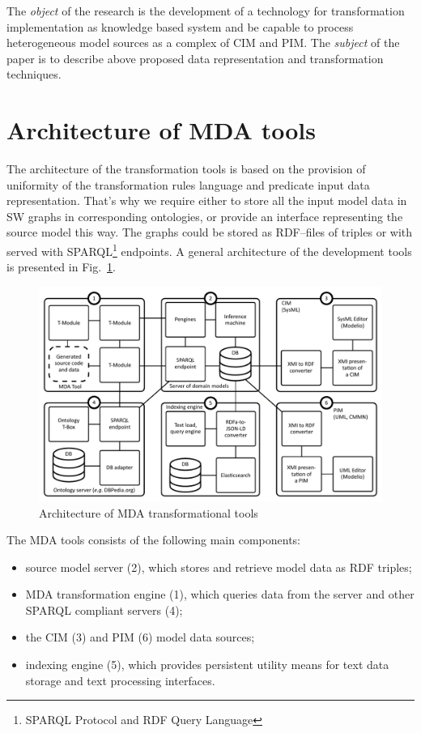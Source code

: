 \documentclass[conference]{IEEEtran}
\begin{document}
The \emph{object} of the research is the development of a technology for transformation implementation as knowledge based system and be capable to process heterogeneous model sources as a complex of CIM and PIM. The \emph{subject} of the paper is to describe above proposed data representation and transformation techniques.

\section{Architecture of MDA tools}


The architecture of the transformation tools is based on the provision of uniformity of the transformation rules language and predicate input data representation.  That's why we require either to store all the input model data in SW graphs in corresponding ontologies, or provide an interface representing the source model this way.  The graphs could be stored as RDF--files of triples or with served with SPARQL\footnote{SPARQL Protocol and RDF Query Language} endpoints.  A general architecture of the development tools is presented in Fig.~\ref{fig:archi}.

\begin{figure}[htb]
  \centering
   \includegraphics[width=1\linewidth]{pics/architecture-mda-lod-ext.pdf}
  \caption{Architecture of MDA transformational tools}
  \label{fig:archi}
\end{figure}

The MDA tools consists of the following main components:
\begin{itemize}
\item source model server (2), which stores and retrieve model data as RDF triples;
\item MDA transformation engine (1), which queries data from the server and other SPARQL compliant servers (4);
\item the CIM (3) and PIM (6) model data sources;
\item indexing engine (5), which provides persistent utility means for text data storage and text processing interfaces.
\end{itemize}
\end{document}
